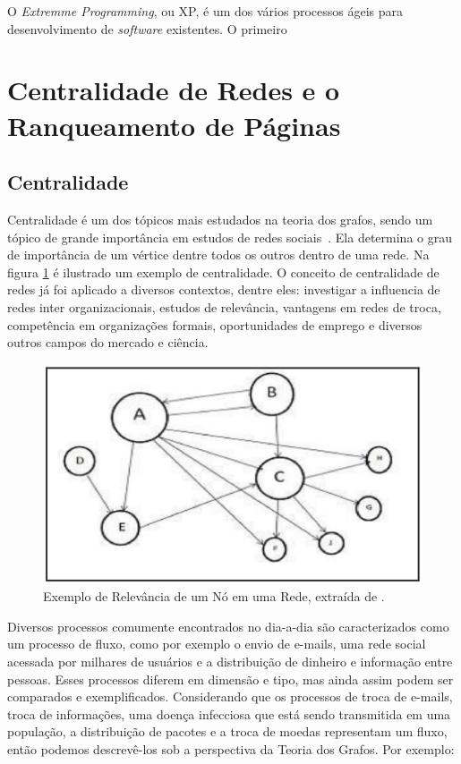 O \textit{Extremme Programming}, ou XP, é um dos vários processos ágeis para desenvolvimento de \textit{software} existentes. O primeiro 



\section{Centralidade de Redes e o Ranqueamento de Páginas}
\label{ref:ran}

\subsection{Centralidade}
\label{ref:ran:cen}
Centralidade é um dos tópicos mais estudados na teoria dos grafos, sendo um tópico de grande importância em estudos de redes sociais~\cite{networks}. Ela determina o grau de importância de um vértice dentre todos os outros dentro de uma rede. Na figura \ref{fig:centrality} é ilustrado um exemplo de centralidade. O conceito de centralidade de redes já foi aplicado a diversos contextos, dentre eles: investigar a influencia de redes inter organizacionais, estudos de relevância, vantagens em redes de troca, competência em organizações formais, oportunidades de emprego e diversos outros campos do mercado e ciência\cite{centrality}.

\begin{figure}[!h]
    \centering
        \includegraphics[keepaspectratio=true,scale=0.5]{figuras/centrality.eps}
    \caption{Exemplo de Relevância de um Nó em uma Rede, extraída de \cite{muppidi}.}
    \label{fig:centrality}
\end{figure}

Diversos processos comumente encontrados no dia-a-dia são caracterizados como um processo de fluxo, como por exemplo o envio de e-mails, uma rede social acessada por milhares de usuários e a distribuição de dinheiro e informação entre pessoas. Esses processos diferem em dimensão e tipo, mas ainda assim podem ser comparados e exemplificados. Considerando que os processos de troca de e-mails, troca de informações, uma doença infecciosa que está sendo transmitida em uma população, a distribuição de pacotes e a troca de moedas representam um fluxo, então podemos descrevê-los sob a perspectiva da Teoria dos Grafos\cite{ceflow}. Por exemplo:

